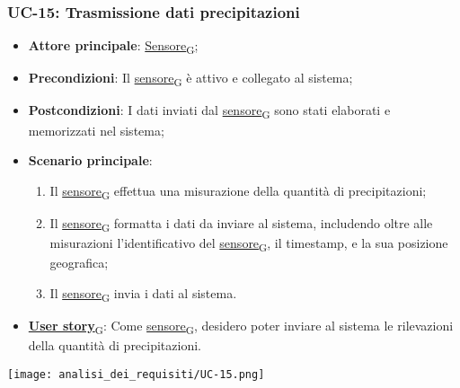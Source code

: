 \subsubsection{UC-15: Trasmissione dati precipitazioni}
\begin{itemize}
	\item \textbf{Attore principale}: \href{https://7last.github.io/docs/rtb/documentazione-interna/glossario\#sensore}{Sensore\textsubscript{G}};
	\item \textbf{Precondizioni}: Il \href{https://7last.github.io/docs/rtb/documentazione-interna/glossario\#sensore}{sensore\textsubscript{G}} è attivo e collegato al sistema;
	\item \textbf{Postcondizioni}: I dati inviati dal \href{https://7last.github.io/docs/rtb/documentazione-interna/glossario\#sensore}{sensore\textsubscript{G}} sono stati elaborati e memorizzati nel sistema;
	\item \textbf{Scenario principale}:
	      \begin{enumerate}
		      \item Il \href{https://7last.github.io/docs/rtb/documentazione-interna/glossario\#sensore}{sensore\textsubscript{G}} effettua una misurazione della quantità di precipitazioni;
		      \item Il \href{https://7last.github.io/docs/rtb/documentazione-interna/glossario\#sensore}{sensore\textsubscript{G}} formatta i dati da inviare al sistema, includendo oltre alle misurazioni l'identificativo del \href{https://7last.github.io/docs/rtb/documentazione-interna/glossario\#sensore}{sensore\textsubscript{G}},
		            il timestamp, e la sua posizione geografica;
		      \item Il \href{https://7last.github.io/docs/rtb/documentazione-interna/glossario\#sensore}{sensore\textsubscript{G}} invia i dati al sistema.
	      \end{enumerate}
	\item \href{https://7last.github.io/docs/rtb/documentazione-interna/glossario\#user-story}{\textbf{User story}\textsubscript{G}}: Come \href{https://7last.github.io/docs/rtb/documentazione-interna/glossario\#sensore}{sensore\textsubscript{G}}, desidero poter inviare al sistema le rilevazioni della quantità di precipitazioni.
\end{itemize}

\begin{center}
	\texttt{[image: analisi\_dei\_requisiti/UC-15.png]}
\end{center}

